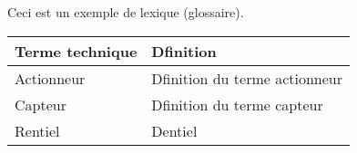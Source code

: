Ceci est un exemple de lexique (glossaire).

\begin{center}
\begin{tabular}{ll}
\hline
\textbf{Terme technique} & \textbf{Dfinition} \\ \hline\hline
Actionneur  & Dfinition du terme actionneur \\
Capteur     & Dfinition du terme capteur \\
Rentiel & Dentiel \\
\hline
\end{tabular}
\end{center}
